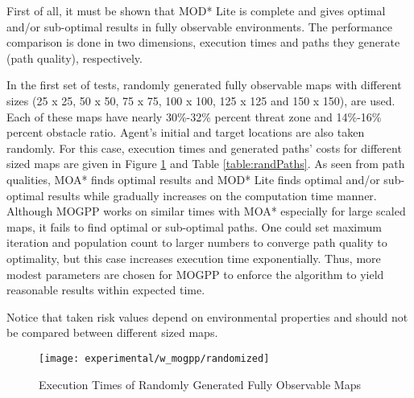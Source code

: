 First of all, it must be shown that MOD* Lite is complete and gives optimal and/or sub-optimal results in fully observable environments. The performance comparison is done in two dimensions, execution times and paths they generate (path quality), respectively.

In the first set of tests, randomly generated fully observable maps with different sizes (25 x 25, 50 x 50, 75 x 75, 100 x 100, 125 x 125 and 150 x 150), are used. Each of these maps have nearly 30\%-32\% percent threat zone and 14\%-16\% percent obstacle ratio. Agent's initial and target locations are also taken randomly. For this case, execution times and generated paths' costs for different sized maps are given in Figure \ref{fig:rand_fully} and Table \ref{table:randPaths}. As seen from path qualities, MOA* finds optimal results and MOD* Lite finds optimal and/or sub-optimal results while gradually increases on the computation time manner. Although MOGPP works on similar times with MOA*
 especially for large scaled maps, it fails to find optimal or sub-optimal paths. One could set maximum iteration and population count to larger numbers to converge path quality to optimality, but this case increases execution time exponentially. Thus, more modest parameters are chosen for MOGPP to enforce the algorithm to yield reasonable results within expected time. 
 
Notice that taken risk values depend on environmental properties and should not be compared between different sized maps.

\begin{figure}
\centering
\texttt{[image: experimental/w\_mogpp/randomized]}
\caption{Execution Times of Randomly Generated Fully Observable Maps}
\label{fig:rand_fully}
\end{figure}

